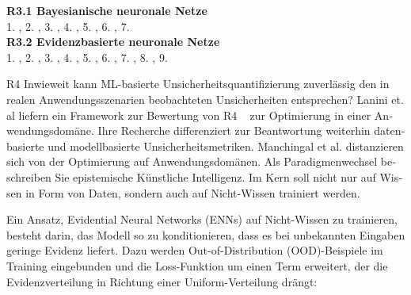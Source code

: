 \begin{otherlanguage}{ngerman}
{\begin{minipage}[t]{\textwidth}
\textbf{R3.1 Bayesianische neuronale Netze}\\
1. \parencite[Kap.~2.3]{gal2016uncertainty},
2. \parencite[Kap.~3]{blundell2015weight},
3. \parencite[S.~40–41]{gal2016uncertainty},
4. \parencite[S.~41–42]{gal2016uncertainty},
5. \parencite[Kap.~7.4]{rasmussen2006gaussian},
6. \parencite[S.~16]{bishop2006pattern},
7. \parencite[S.~29–31]{gal2016uncertainty} \\[0.125em]

\textbf{R3.2 Evidenzbasierte neuronale Netze}\\
1. \parencite{sensoy2018evidential},
2. \parencite[S.~3–4]{sensoy2018evidential},
3. \parencite[S.~4]{sensoy2018evidential},
4. \parencite[S.~5]{sensoy2018evidential},
5. \parencite[S.~6]{sensoy2018evidential},
6. \parencite[S.~6–7]{sensoy2018evidential},
7. \parencite{kendall2017uncertainties},
8. \parencite{kendall2017uncertainties},
9. \parencite[S.~6]{sensoy2018evidential}
\end{minipage}%
}

\pagebreak


R4 Inwieweit kann ML-basierte Unsicherheitsquantifizierung zuverlässig den in realen Anwendungsszenarien beobachteten Unsicherheiten entsprechen?
\newline
Lanini et. al liefern ein Framework zur Bewertung von R4 ~\parencite{Lanini2024} zur Optimierung in einer Anwendungsdomäne. Ihre Recherche differenziert zur Beantwortung weiterhin datenbasierte und modellbasierte Unsicherheitsmetriken. 
\newline
Manchingal et al. distanzieren sich von der Optimierung auf Anwendungsdomänen. Als Paradigmenwechsel beschreiben Sie epistemische Künstliche Intelligenz. Im Kern soll nicht nur auf Wissen in Form von Daten, sondern auch auf Nicht-Wissen trainiert werden. \parencite{manchingal2025}

Ein Ansatz, Evidential Neural Networks (ENNs) auf Nicht-Wissen zu trainieren, besteht darin, das Modell so zu konditionieren, dass es bei unbekannten Eingaben geringe Evidenz liefert. Dazu werden Out-of-Distribution (OOD)-Beispiele im Training eingebunden und die Loss-Funktion um einen Term erweitert, der die Evidenzverteilung in Richtung einer Uniform-Verteilung drängt:



\end{otherlanguage}

